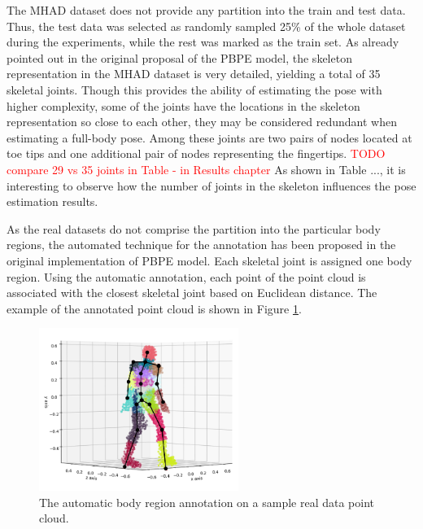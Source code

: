 \vspace{5mm}
\noindent
The MHAD dataset does not provide any partition into the train and test data. Thus, the test data was selected as randomly sampled 25\% of the whole dataset during the experiments, while the rest was marked as the train set. %
As already pointed out in the original proposal of the PBPE model, the skeleton representation in the MHAD dataset is very detailed, yielding a total of 35 skeletal joints. Though this provides the ability of estimating the pose with higher complexity, some of the joints have the locations in the skeleton representation so close to each other, they may be considered redundant when estimating a full-body pose. Among these joints are two pairs of nodes located at toe tips and one additional pair of nodes representing the fingertips.
\textcolor{red}{TODO compare 29 vs 35 joints in Table - in Results chapter} As shown in Table ..., it is interesting to observe how the number of joints in the skeleton influences the pose estimation results.\par
\vspace{5mm}
\noindent 
As the real datasets do not comprise the partition into the particular body regions, the automated technique for the annotation has been proposed in the original implementation of PBPE model. Each skeletal joint is assigned one body region. Using the automatic annotation, each point of the point cloud is associated with the closest skeletal joint based on Euclidean distance. The example of the annotated point cloud is shown in Figure \ref{fig:reg_annotation}.\par 

\vspace{5mm}
\begin{figure}[H]
\begin{center}
  \includegraphics[height=200px]{images/implementation/region_annotation.png}
  \caption[The automatic body region annotation on real data.]{The automatic body region annotation on a sample real data point cloud.}
  \label{fig:reg_annotation}
\end{center}
\end{figure}

